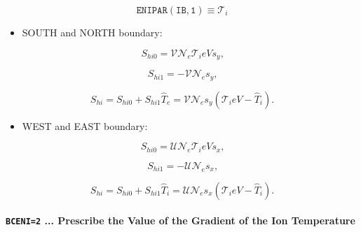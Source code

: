 \documentclass[11pt]{article}
\begin{document}
\bigskip

\begin{equation*}
\mathtt{ENIPAR(IB,1)}\equiv\mathcal{T}_{i}
\end{equation*}

\bigskip

\begin{itemize}
\item  SOUTH and NORTH boundary:
\end{itemize}

\bigskip

\begin{equation}
S_{hi0}=\mathcal{VN}_{e}\mathcal{T}_{i}eVs_{y}\text{,}   \label{c228}
\end{equation}

\begin{equation}
S_{hi1}=-\mathcal{VN}_{e}s_{y}\text{,}   \label{c229}
\end{equation}

\begin{equation}
S_{hi}=S_{hi0}+S_{hi1}\widehat{T}_{e}=\mathcal{VN}_{e}s_{y}\left( \mathcal{T}%
_{i}eV-\widehat{T}_{i}\right) \text{.}   \label{c230}
\end{equation}

\bigskip

\begin{itemize}
\item  WEST and EAST boundary:
\end{itemize}

\bigskip

\begin{equation}
S_{hi0}=\mathcal{UN}_{e}\mathcal{T}_{i}eVs_{x}\text{,}   \label{c231}
\end{equation}

\begin{equation}
S_{hi1}=-\mathcal{UN}_{e}s_{x}\text{,}   \label{c232}
\end{equation}

\begin{equation}
S_{hi}=S_{hi0}+S_{hi1}\widehat{T}_{i}=\mathcal{UN}_{e}s_{x}\left( \mathcal{T}%
_{i}eV-\widehat{T}_{i}\right) \text{.}   \label{c233}
\end{equation}

\bigskip

\paragraph{\texttt{BCENI=2} ... Prescribe the Value of the Gradient of the
Ion Temperature}
\end{document}
